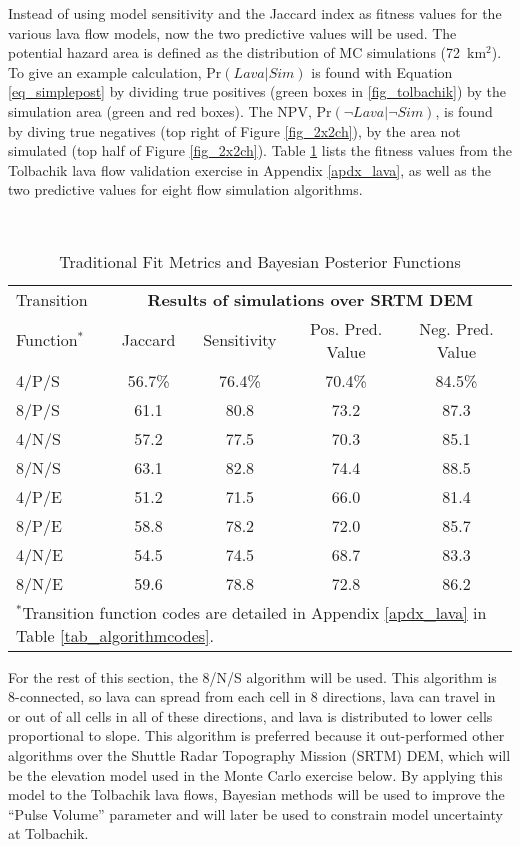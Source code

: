 	Instead of using model sensitivity and the Jaccard index as fitness values for the various lava flow models, now the two predictive values will be used. The potential hazard area is defined as the distribution of MC simulations (72~km$^2$). To give an example calculation, $\text{Pr}(Lava|Sim)$ is found with Equation \ref{eq_simplepost} by dividing true positives (green boxes in \ref{fig_tolbachik}) by the simulation area (green and red boxes). The NPV, $\text{Pr}(\neg Lava|\neg Sim)$, is found by diving true negatives (top right of Figure \ref{fig_2x2ch}), by the area not simulated (top half of Figure \ref{fig_2x2ch}). Table \ref{tab_fitmetriccompare} lists the fitness values from the Tolbachik lava flow validation exercise in Appendix \ref{apdx_lava}, as well as the two predictive values for eight flow simulation algorithms.
	
		\begin{table}[h]
		\centering
		\caption{Traditional Fit Metrics and Bayesian Posterior Functions}\\
		\begin{tabular}{l c c c c}
			\toprule
			Transition&\multicolumn{4}{c}{\textbf{Results of simulations over SRTM DEM}}\\
			Function$^*$& Jaccard & Sensitivity & Pos. Pred. Value & Neg. Pred. Value\\
			\midrule
			4/P/S & 56.7\%& 76.4\%& 70.4\%& 84.5\% \\
			8/P/S & 61.1  & 80.8  & 73.2  & 87.3   \\
			4/N/S & 57.2  & 77.5  & 70.3  & 85.1   \\
			8/N/S & 63.1  & 82.8  & 74.4  & 88.5   \\
			4/P/E & 51.2  & 71.5  & 66.0  & 81.4   \\
			8/P/E & 58.8  & 78.2  & 72.0  & 85.7   \\
			4/N/E & 54.5  & 74.5  & 68.7  & 83.3   \\
			8/N/E & 59.6  & 78.8  & 72.8  & 86.2   \\
			\bottomrule
			\multicolumn{5}{p{0.8\linewidth}}{$^*$Transition function codes are detailed in Appendix \ref{apdx_lava} in Table \ref{tab_algorithmcodes}.}
		\end{tabular}
		\label{tab_fitmetriccompare}
	\end{table}
	
	For the rest of this section, the 8/N/S algorithm will be used. This algorithm is 8-connected, so lava can spread from each cell in 8 directions, lava can travel in or out of all cells in all of these directions, and lava is distributed to lower cells proportional to slope. This algorithm is preferred because it out-performed other algorithms over the Shuttle Radar Topography Mission (SRTM) DEM, which will be the elevation model used in the Monte Carlo exercise below. By applying this model to the Tolbachik lava flows, Bayesian methods will be used to improve the ``Pulse Volume'' parameter and will later be used to constrain model uncertainty at Tolbachik.
	
